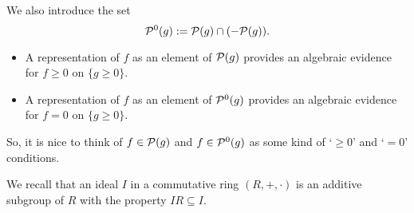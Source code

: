 We also introduce the set 
\[
	\mathcal{P}^0(g):= \mathcal{P}(g) \cap (-\mathcal{P}(g)).
\]

\begin{itemize}
	\item A representation of $f$ as an element of $\mathcal{P}(g)$ provides an algebraic evidence for $f \ge 0$ on $\{g \ge 0\}$. 
	\item A representation of $f$ as an element of $\mathcal{P}^0(g)$ provides an algebraic evidence for $f = 0$ on $\{g \ge 0\}$. 
\end{itemize}

So, it is nice to think of $f \in \mathcal{P}(g)$ and $f \in \mathcal{P}^0(g)$ as some kind of `$\ge 0$' and `$=0$' conditions. 




We recall that an ideal $I$ in a commutative ring $(R,+,\cdot)$ is an additive subgroup of $R$ with the property $I R \subseteq I$. 

